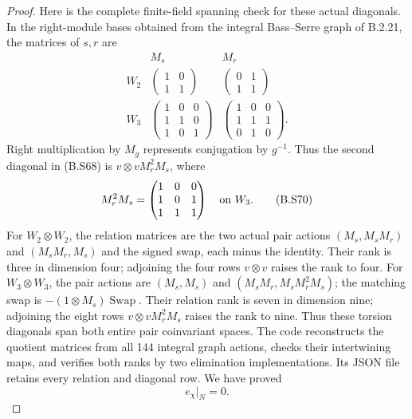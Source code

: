 \begin{proof}
Here is the complete finite-field spanning check for
these actual diagonals.  In the right-module bases
obtained from the integral Bass--Serre graph of B.2.21,
the matrices of $s,r$ are
\[
\begin{array}{c|c|c}
 &M_s&M_r\\ \hline
 W_2&\left(\begin{smallmatrix}1&0\\1&1\end{smallmatrix}\right)
     &\left(\begin{smallmatrix}0&1\\1&1\end{smallmatrix}\right)\\[2mm]
 W_3&\left(\begin{smallmatrix}1&0&0\\1&1&0\\1&0&1\end{smallmatrix}\right)
     &\left(\begin{smallmatrix}1&0&0\\1&1&1\\0&1&0\end{smallmatrix}\right).
\end{array}                                                   \tag{B.S69}
\]
Right multiplication by $M_g$ represents conjugation
by $g^{-1}$.  Thus the second diagonal in (B.S68) is
$v\otimes vM_r^2M_s$, where
\[
       M_r^2M_s=
       \begin{pmatrix}1&0&0\\1&0&1\\1&1&1\end{pmatrix}
                         \quad\hbox{on }W_3.                \tag{B.S70}
\]
For $W_2\otimes W_2$, the relation matrices are
the two actual pair actions
$(M_s,M_sM_r)$ and $(M_sM_r,M_s)$ and the signed
swap, each minus the identity.  Their rank is three
in dimension four; adjoining the four rows
$v\otimes v$ raises the rank to four.
For $W_3\otimes W_3$, the pair actions are
$(M_s,M_s)$ and $(M_sM_r,M_sM_r^2M_s)$; the matching
swap is $-(1\otimes M_s)\operatorname{Swap}$.
Their relation rank is seven in dimension nine;
adjoining the eight rows $v\otimes vM_r^2M_s$
raises the rank to nine.  Thus these torsion diagonals
span both entire pair coinvariant spaces.  The code
reconstructs the quotient matrices from all 144
integral graph actions, checks their intertwining
maps, and verifies both ranks by two elimination
implementations.  Its JSON file retains every relation
and diagonal row.  We have proved
\[
                  e_\chi|_{N}=0.                            \tag{B.S71}
\]


\end{proof}
